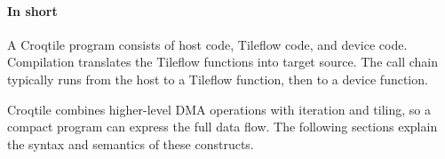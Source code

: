 \paragraph*{In short}

A Croqtile program consists of host code, Tileflow code, and device code. Compilation translates the Tileflow functions into target source. The call chain typically runs from the host to a Tileflow function, then to a device function.

Croqtile combines higher-level DMA operations with iteration and tiling, so a compact program can express the full data flow. The following sections explain the syntax and semantics of these constructs.
